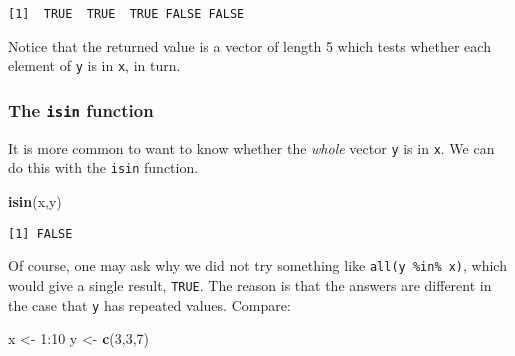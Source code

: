 \documentclass[]{book}
\newenvironment{Shaded}{\begin{snugshade}}{\end{snugshade}}
\newcommand{\KeywordTok}[1]{\textcolor[rgb]{0.13,0.29,0.53}{\textbf{{#1}}}}
\newcommand{\DecValTok}[1]{\textcolor[rgb]{0.00,0.00,0.81}{{#1}}}
\newcommand{\StringTok}[1]{\textcolor[rgb]{0.31,0.60,0.02}{{#1}}}
\newcommand{\NormalTok}[1]{{#1}}
\numberwithin{equation}{chapter}
\numberwithin{figure}{chapter}
\theoremstyle{plain}
\theoremstyle{definition}
\theoremstyle{remark}
\theoremstyle{definition}
\theoremstyle{definition}
\theoremstyle{remark}
\begin{document}
\begin{Shaded}
\end{Shaded}

\begin{verbatim}
[1]  TRUE  TRUE  TRUE FALSE FALSE
\end{verbatim}

Notice that the returned value is a vector of length 5 which tests
whether each element of \texttt{y} is in \texttt{x}, in turn.

\subsubsection{\texorpdfstring{The \texttt{isin}
function}{The isin function}}\label{the-isin-function}

It is more common to want to know whether the \emph{whole} vector
\texttt{y} is in \texttt{x}. We can do this with the \texttt{isin}
function.

\begin{Shaded}
\begin{Highlighting}[]
\KeywordTok{isin}\NormalTok{(x,y) }
\end{Highlighting}
\end{Shaded}

\begin{verbatim}
[1] FALSE
\end{verbatim}

Of course, one may ask why we did not try something like
\texttt{all(y\ \%in\%\ x)}, which would give a single result,
\texttt{TRUE}. The reason is that the answers are different in the case
that \texttt{y} has repeated values. Compare:

\begin{Shaded}
\begin{Highlighting}[]
\NormalTok{x <-}\StringTok{ }\DecValTok{1}\NormalTok{:}\DecValTok{10} 
\NormalTok{y <-}\StringTok{ }\KeywordTok{c}\NormalTok{(}\DecValTok{3}\NormalTok{,}\DecValTok{3}\NormalTok{,}\DecValTok{7}\NormalTok{) }
\end{Highlighting}
\end{Shaded}

\begin{Shaded}
\end{Shaded}
\end{document}
